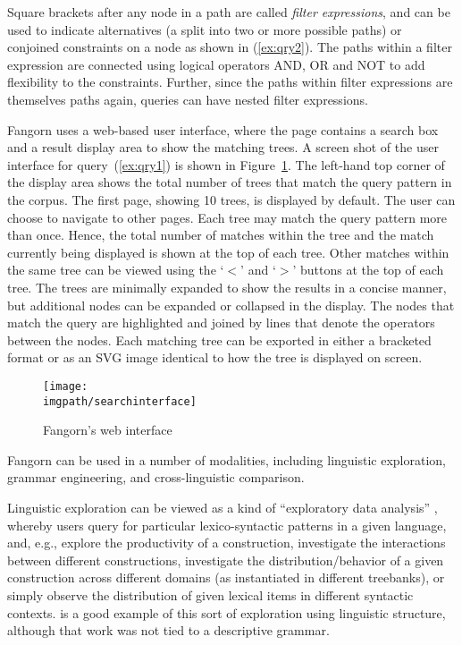 Square brackets after any node in a path are called {\it filter expressions},
and can be used to indicate alternatives (a split into two or more possible
paths) or conjoined constraints on a node as shown in (\ref{ex:qry2}). 
The paths within a filter expression are
connected using logical operators AND, OR and NOT to add
flexibility to the constraints.  Further, since the paths within
filter expressions are themselves paths again, queries can have nested
filter expressions.



Fangorn uses a web-based user interface, where the page
contains a search box and a result display area to show the matching
trees. A screen shot of the user interface for query~(\ref{ex:qry1}) 
is shown in Figure~\ref{fig:ts-web}.
The left-hand top corner of the display area shows the total
number of trees that match the query pattern in the corpus.  The first
page, showing 10 trees, is displayed by default. The user can choose
to navigate to other pages. Each tree may match the query pattern more
than once. Hence, the total number of matches within the tree and the
match currently being displayed is shown at the top of each
tree. Other matches within the same tree can be viewed using the
`$<$' and `$>$' buttons at the top of each tree. The trees are
minimally expanded to show the results in a concise manner, but
additional nodes can be expanded or collapsed in the display.  The
nodes that match the query are highlighted and joined by lines that
denote the operators between the nodes. Each matching tree can be
exported in either a bracketed format or as an SVG image identical
to how the tree is displayed on screen.

\begin{figure}[t]
\centering
\texttt{[image: \\imgpath/searchinterface]}
\caption{Fangorn's web interface}
\label{fig:ts-web}
\end{figure}

Fangorn can be used in a number of modalities, including
linguistic exploration, grammar engineering, and cross-linguistic
comparison.

Linguistic exploration can be viewed as a kind of ``exploratory data
analysis'' \citep{Tukey77}, whereby users query for particular
lexico-syntactic patterns in a given language, and, e.g., explore
the productivity of a construction, investigate the interactions between
different constructions, investigate the distribution/behavior of a
given construction across different domains (as instantiated in
different treebanks), or simply observe the distribution of given
lexical items in different syntactic contexts.  is a good example of this sort of exploration using linguistic structure, although that work was not tied to a descriptive grammar.

